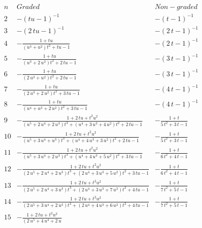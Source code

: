 \begin{displaymath}
\begin{array}{|r|c|c|}
  \hline
  n & Graded & Non-graded \\ \hline
2 &-\left (tu-1\right )^{-1}
& -\left (t-1\right )^{-1}
\\
3 &
-\left (2\,tu-1\right )^{-1}
&
-\left (2\,t-1\right )^{-1}
\\
4 &
-{\frac {1+tu}{\left ({u}^{3}+{u}^{2}\right ){t}^{2}+tu-1}}
&
-\left (2\,t-1\right )^{-1}
\\
5 &
-{\frac {1+tu}{\left ({u}^{3}+2\,{u}^{2}\right ){t}^{2}+2\,tu-1}}
&
-\left (3\,t-1\right )^{-1}
\\
6 &
-{\frac {1+tu}{\left (2\,{u}^{3}+{u}^{2}\right ){t}^{2}+2\,tu-1}}
&
-\left (3\,t-1\right )^{-1}
\\
7 &
-{\frac {1+tu}{\left (2\,{u}^{3}+2\,{u}^{2}\right ){t}^{2}+3\,tu-1}}
&
-\left (4\,t-1\right )^{-1}
\\
8 &
-{\frac {1+tu}{\left ({u}^{4}+{u}^{3}+2\,{u}^{2}\right ){t}^{2}+3\,tu-
1}}
&
-\left (4\,t-1\right )^{-1}
\\
9 &
-{\frac {1+2\,tu+{t}^{2}{u}^{2}}{\left ({u}^{5}+2\,{u}^{4}+2\,{u}^{3}
\right ){t}^{3}+\left ({u}^{4}+3\,{u}^{3}+4\,{u}^{2}\right ){t}^{2}+2
\,tu-1}}
&
-{\frac {1+t}{5\,{t}^{2}+3\,t-1}}
\\
10 &
-{\frac {1+2\,tu+{t}^{2}{u}^{2}}{\left ({u}^{5}+3\,{u}^{4}+{u}^{3}
\right ){t}^{3}+\left ({u}^{4}+4\,{u}^{3}+3\,{u}^{2}\right ){t}^{2}+2
\,tu-1}}
&
-{\frac {1+t}{5\,{t}^{2}+3\,t-1}}
\\
11 &
-{\frac {1+2\,tu+{t}^{2}{u}^{2}}{\left ({u}^{5}+3\,{u}^{4}+2\,{u}^{3}
\right ){t}^{3}+\left ({u}^{4}+4\,{u}^{3}+5\,{u}^{2}\right ){t}^{2}+3
\,tu-1}}
&
-{\frac {1+t}{6\,{t}^{2}+4\,t-1}}
\\
12 &
-{\frac {1+2\,tu+{t}^{2}{u}^{2}}{\left (2\,{u}^{5}+2\,{u}^{4}+2\,{u}^{
3}\right ){t}^{3}+\left (2\,{u}^{4}+3\,{u}^{3}+5\,{u}^{2}\right ){t}^{
2}+3\,tu-1}}
&
-{\frac {1+t}{6\,{t}^{2}+4\,t-1}}
\\
13 &
-{\frac {1+2\,tu+{t}^{2}{u}^{2}}{\left (2\,{u}^{5}+2\,{u}^{4}+3\,{u}^{
3}\right ){t}^{3}+\left (2\,{u}^{4}+3\,{u}^{3}+7\,{u}^{2}\right ){t}^{
2}+4\,tu-1}}
&
-{\frac {1+t}{7\,{t}^{2}+5\,t-1}}
\\
14 &
-{\frac {1+2\,tu+{t}^{2}{u}^{2}}{\left (2\,{u}^{5}+3\,{u}^{4}+2\,{u}^{
3}\right ){t}^{3}+\left (2\,{u}^{4}+4\,{u}^{3}+6\,{u}^{2}\right ){t}^{
2}+4\,tu-1}}
&
-{\frac {1+t}{7\,{t}^{2}+5\,t-1}}
\\
15 &
-{\frac {1+2\,tu+{t}^{2}{u}^{2}}{\left (2\,{u}^{5}+4\,{u}^{4}+2\,{u}^{
}}}
\end{array}
\end{displaymath}
